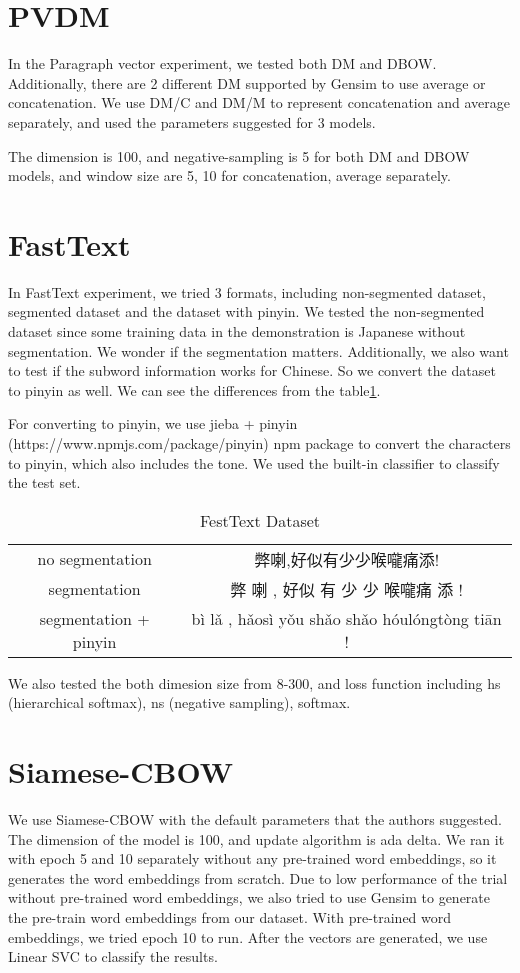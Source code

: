 \section{PVDM}

In the Paragraph vector experiment, we tested both DM and DBOW. Additionally, there are 2 different DM supported by Gensim to use average or concatenation.
We use DM/C and DM/M to represent concatenation and average separately, and used the parameters suggested for 3 models. 

The dimension is 100, and negative-sampling is 5 for both DM and DBOW models, and window size are 5, 10 for concatenation, average separately. 

\section{FastText}

In FastText experiment, we tried 3 formats, including non-segmented dataset, segmented dataset and the dataset with pinyin.
We tested the non-segmented dataset since some training data in the demonstration is Japanese without segmentation. We wonder if the segmentation matters.
Additionally, we also want to test if the subword information works for Chinese. So we convert the dataset to pinyin as well. We can see the differences from the table\ref{ftdataset}.

For converting to pinyin, we use jieba + pinyin (https://www.npmjs.com/package/pinyin) npm package to convert the characters to pinyin, which also includes the tone.
We used the built-in classifier to classify the test set.

\begin{table}[]
\centering
\caption{FestText Dataset}
\label{ftdataset}
\begin{tabular}{|c|c|}
\hline
   & \\
\hline
no segmentation  & 弊喇,好似有少少喉嚨痛添! \\
segmentation  & 弊 喇 , 好似 有 少 少 喉嚨痛 添 ! \\
segmentation + pinyin  & bì lǎ , hǎosì yǒu shǎo shǎo hóulóngtòng tiān ! \\
\hline
\end{tabular}
\end{table}

We also tested the both dimesion size from 8-300, and loss function including hs (hierarchical softmax), ns (negative sampling), softmax.


\section{Siamese-CBOW}

We use Siamese-CBOW with the default parameters that the authors suggested. 
The dimension of the model is 100, and update algorithm is ada delta. 
We ran it with epoch 5 and 10 separately without any pre-trained word embeddings, so it generates the word embeddings from scratch.
Due to low performance of the trial without pre-trained word embeddings, we also tried to use Gensim to generate the pre-train word embeddings from our dataset.
With pre-trained word embeddings, we tried epoch 10 to run. After the vectors are generated, we use Linear SVC to classify the results. 